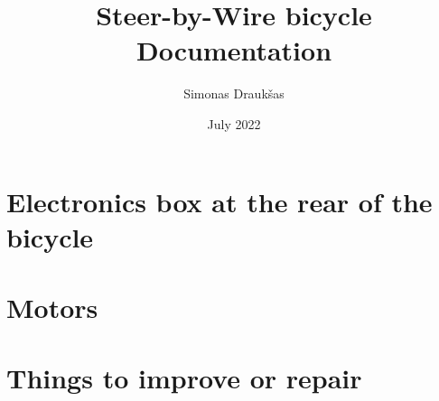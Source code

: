 \documentclass[12pt,a4paper]{report}
\title{Steer-by-Wire bicycle \\ Documentation}
\author{Simonas Draukšas}
\date{July 2022}
\begin{document}
\maketitle

\tableofcontents

\chapter{Electronics box at the rear of the bicycle}


\chapter{Motors}


\chapter{Things to improve or repair}

\end{document}
